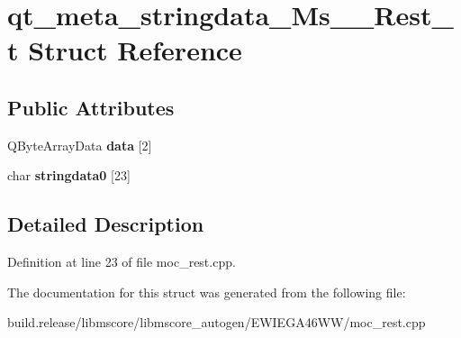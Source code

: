 \hypertarget{structqt__meta__stringdata___ms_____rest__t}{}\section{qt\+\_\+meta\+\_\+stringdata\+\_\+\+Ms\+\_\+\+\_\+\+Rest\+\_\+t Struct Reference}
\label{structqt__meta__stringdata___ms_____rest__t}
\subsection*{Public Attributes}
\begin{DoxyCompactItemize}
\item 
\mbox{\label{structqt__meta__stringdata___ms_____rest__t_a0db554f0d04b132ff1b32e4ab0ed2419}} 
Q\+Byte\+Array\+Data {\bfseries data} \mbox{[}2\mbox{]}
\item 
\mbox{\label{structqt__meta__stringdata___ms_____rest__t_abe6a16a5ad5f817263d6d95bb7f30b7a}} 
char {\bfseries stringdata0} \mbox{[}23\mbox{]}
\end{DoxyCompactItemize}


\subsection{Detailed Description}


Definition at line 23 of file moc\+\_\+rest.\+cpp.



The documentation for this struct was generated from the following file\+:\begin{DoxyCompactItemize}
\item 
build.\+release/libmscore/libmscore\+\_\+autogen/\+E\+W\+I\+E\+G\+A46\+W\+W/moc\+\_\+rest.\+cpp\end{DoxyCompactItemize}
